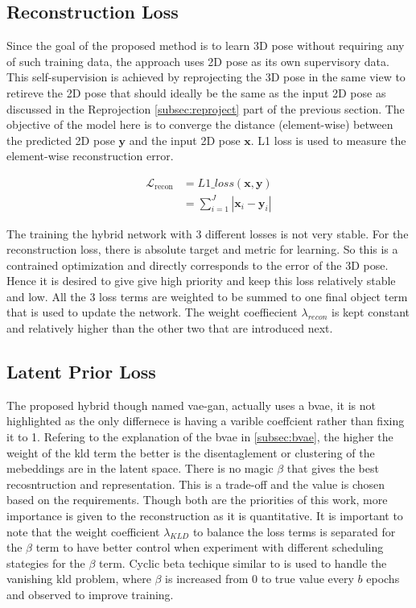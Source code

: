 \subsection{Reconstruction Loss}
Since the goal of the proposed method is to learn 3D pose without requiring any of such training data, the approach uses 2D pose as its own supervisory data. This self-supervision is achieved by reprojecting the 3D pose in the same view to retireve the 2D pose that should ideally be the same as the input 2D pose as discussed in the Reprojection \ref{subsec:reproject} part of the previous section. The objective of the model here is to converge the distance (element-wise) between the predicted 2D pose $\textbf{y}$ and the input 2D pose $\textbf{x}$. L1 loss is used to measure the element-wise reconstruction error.

\begin{equation} \label{loss_recon}
    \begin{split}
        \mathcal{L}_{\text {recon}}  & = L1\_loss(\textbf{x}, \textbf{y}) \\
        & = \sum_{i=1}^J |\textbf{x}_i - \textbf{y}_i|
    \end{split}
\end{equation}

The training the hybrid network with 3 different losses is not very stable. For the reconstruction loss, there is absolute target and metric for learning. So this is a contrained optimization and directly corresponds to the error of the 3D pose. Hence it is desired to give give high priority and keep this loss relatively stable and low. All the 3 loss terms are weighted to be summed to one final object term that is used to update the network. The weight coeffiecient $\lambda_{recon}$ is kept constant and relatively higher than the other two that are introduced next.

\subsection{Latent Prior Loss}

The proposed hybrid though named \ac{vae}-\ac{gan}, actually uses a \ac{bvae}, it is not highlighted as the only differnece is having a varible coeffcient rather than fixing it to 1. Refering to the explanation of the \ac{bvae} in \ref{subsec:bvae}, the higher the weight of the \ac{kld} term the better is the disentaglement or clustering of the mebeddings are in the latent space. There is no magic $\beta$ that gives the best recosntruction and representation. This is a trade-off and the value is chosen based on the requirements. Though both are the priorities of this work, more importance is given to the reconstruction as it is quantitative. It is important to note that the weight coefficient $\lambda_{KLD}$ to balance the loss terms is separated for the $\beta$ term to have better control when experiment with different scheduling stategies for the $\beta$ term. Cyclic beta techique similar to \cite{cyclicbeta} is used to handle the vanishing \ac{kld} problem, where $\beta$ is increased from 0 to true value every $b$ epochs and observed to improve training.

